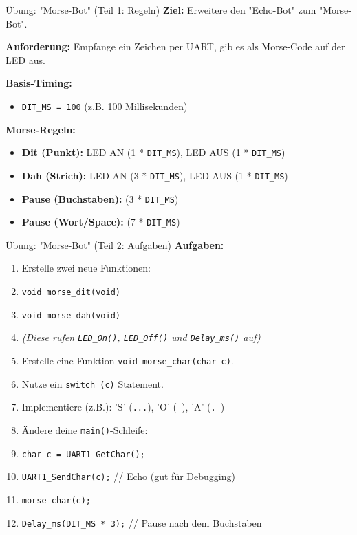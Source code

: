 \documentclass{beamer}
\begin{document}
\begin{frame}{Übung: "Morse-Bot" (Teil 1: Regeln)}
	\textbf{Ziel:} Erweitere den "Echo-Bot" zum "Morse-Bot".
	
	\medskip
	\textbf{Anforderung:} Empfange ein Zeichen per UART, gib es als Morse-Code auf der LED aus.
	
	\medskip
	\textbf{Basis-Timing:}
	\begin{itemize}
		\item \texttt{DIT\_MS = 100} (z.B. 100 Millisekunden)
	\end{itemize}
	
	\textbf{Morse-Regeln:}
	\begin{itemize}
		\item \textbf{Dit (Punkt):} LED AN (1 * \texttt{DIT\_MS}), LED AUS (1 * \texttt{DIT\_MS})
		\item \textbf{Dah (Strich):} LED AN (3 * \texttt{DIT\_MS}), LED AUS (1 * \texttt{DIT\_MS})
		\item \textbf{Pause (Buchstaben):} (3 * \texttt{DIT\_MS})
		\item \textbf{Pause (Wort/Space):} (7 * \texttt{DIT\_MS})
	\end{itemize}
\end{frame}

\begin{frame}[fragile]{Übung: "Morse-Bot" (Teil 2: Aufgaben)}
	\textbf{Aufgaben:}
	\begin{enumerate}
		\item Erstelle zwei neue Funktionen:
		\item \texttt{void morse\_dit(void)}
		\item \texttt{void morse\_dah(void)}
		\item \textit{(Diese rufen \texttt{LED\_On()}, \texttt{LED\_Off()} und \texttt{Delay\_ms()} auf)}
		
		\medskip
		\item Erstelle eine Funktion \texttt{void morse\_char(char c)}.
		\item Nutze ein \texttt{switch (c)} Statement.
		\item Implementiere (z.B.): 'S' (\texttt{...}), 'O' (\texttt{---}), 'A' (\texttt{.-})
		
		\medskip
		\item Ändere deine \texttt{main()}-Schleife:
		\item \texttt{char c = UART1\_GetChar();}
		\item \texttt{UART1\_SendChar(c);} // Echo (gut für Debugging)
		\item \texttt{morse\_char(c);}
		\item \texttt{Delay\_ms(DIT\_MS * 3);} // Pause nach dem Buchstaben
	\end{enumerate}
\end{frame}
\end{document}
